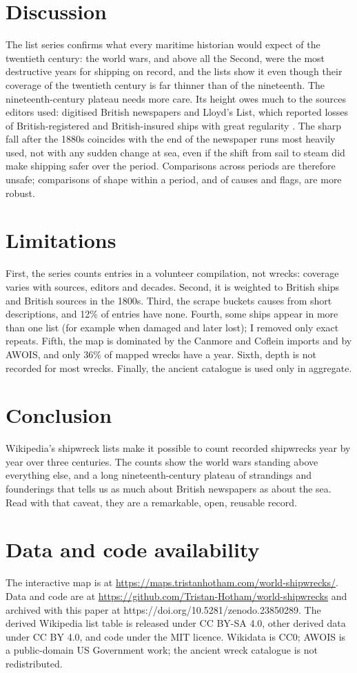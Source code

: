 \documentclass[11pt,a4paper]{article}
\begin{document}
\section{Discussion}
The list series confirms what every maritime historian would expect of the twentieth century: the world wars, and above all the Second, were the most destructive years for shipping on record, and the lists show it even though their coverage of the twentieth century is far thinner than of the nineteenth. The nineteenth-century plateau needs more care. Its height owes much to the sources editors used: digitised British newspapers and Lloyd's List, which reported losses of British-registered and British-insured ships with great regularity \citep{lloyds}. The sharp fall after the 1880s coincides with the end of the newspaper runs most heavily used, not with any sudden change at sea, even if the shift from sail to steam did make shipping safer over the period. Comparisons across periods are therefore unsafe; comparisons of shape within a period, and of causes and flags, are more robust.

\section{Limitations}
First, the series counts entries in a volunteer compilation, not wrecks: coverage varies with sources, editors and decades. Second, it is weighted to British ships and British sources in the 1800s. Third, the scrape buckets causes from short descriptions, and 12\% of entries have none. Fourth, some ships appear in more than one list (for example when damaged and later lost); I removed only exact repeats. Fifth, the map is dominated by the Canmore and Coflein imports and by AWOIS, and only 36\% of mapped wrecks have a year. Sixth, depth is not recorded for most wrecks. Finally, the ancient catalogue is used only in aggregate.

\section{Conclusion}
Wikipedia's shipwreck lists make it possible to count recorded shipwrecks year by year over three centuries. The counts show the world wars standing above everything else, and a long nineteenth-century plateau of strandings and founderings that tells us as much about British newspapers as about the sea. Read with that caveat, they are a remarkable, open, reusable record.

\section*{Data and code availability}
The interactive map is at \url{https://maps.tristanhotham.com/world-shipwrecks/}. Data and code are at \url{https://github.com/Tristan-Hotham/world-shipwrecks} and archived with this paper at https://doi.org/10.5281/zenodo.23850289. The derived Wikipedia list table is released under CC BY-SA 4.0, other derived data under CC BY 4.0, and code under the MIT licence. Wikidata is CC0; AWOIS is a public-domain US Government work; the ancient wreck catalogue is not redistributed.
\end{document}
